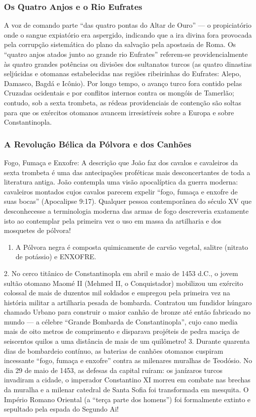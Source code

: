 \subsubsection*{Os Quatro Anjos e o Rio Eufrates}
A voz de comando parte ``das quatro pontas do Altar de Ouro'' — o propiciatório onde o sangue expiatório era aspergido, indicando que a ira divina fora provocada pela corrupção sistemática do plano da salvação pela apostasia de Roma.
Os ``quatro anjos atados junto ao grande rio Eufrates'' referem-se providencialmente às quatro grandes potências ou divisões dos sultanatos turcos (as quatro dinastias seljúcidas e otomanas estabelecidas nas regiões ribeirinhas do Eufrates: Alepo, Damasco, Bagdá e Icônio). Por longo tempo, o avanço turco fora contido pelas Cruzadas ocidentais e por conflitos internos contra os mongóis de Tamerlão; contudo, sob a sexta trombeta, as rédeas providenciais de contenção são soltas para que os exércitos otomanos avancem irresistíveis sobre a Europa e sobre Constantinopla.


\subsubsection*{A Revolução Bélica da Pólvora e dos Canhões}
Fogo, Fumaça e Enxofre:
A descrição que João faz dos cavalos e cavaleiros da sexta trombeta é uma das antecipações proféticas mais desconcertantes de toda a literatura antiga.
João contempla uma visão apocalíptica da guerra moderna: cavaleiros montados cujos cavalos parecem expelir ``fogo, fumaça e enxofre de suas bocas'' (Apocalipse 9:17).
Qualquer pessoa contemporânea do século XV que desconhecesse a terminologia moderna das armas de fogo descreveria exatamente isto ao contemplar pela primeira vez o uso em massa da artilharia e dos mosquetes de pólvora!
\begin{enumerate}
  \item A Pólvora negra é composta quimicamente de carvão vegetal, salitre (nitrato de potássio) e ENXOFRE.
\end{enumerate}

2. No cerco titânico de Constantinopla em abril e maio de 1453 d.C., o jovem sultão otomano Maomé II (Mehmed II, o Conquistador) mobilizou um exército colossal de mais de duzentos mil soldados e empregou pela primeira vez na história militar a artilharia pesada de bombarda. Contratou um fundidor húngaro chamado Urbano para construir o maior canhão de bronze até então fabricado no mundo — a célebre ``Grande Bombarda de Constantinopla'', cujo cano media mais de oito metros de comprimento e disparava projéteis de pedra maciça de seiscentos quilos a uma distância de mais de um quilômetro!
3. Durante quarenta dias de bombardeio contínuo, as baterias de canhões otomanos cuspiram incessante ``fogo, fumaça e enxofre'' contra as milenares muralhas de Teodósio. No dia 29 de maio de 1453, as defesas da capital ruíram: os janízaros turcos invadiram a cidade, o imperador Constantino XI morreu em combate nas brechas da muralha e a milenar catedral de Santa Sofia foi transformada em mesquita. O Império Romano Oriental (a ``terça parte dos homens'') foi formalmente extinto e sepultado pela espada do Segundo Ai!



